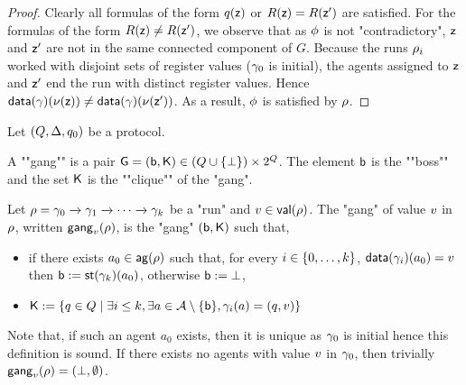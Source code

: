 \begin{proof}
	
	Clearly all formulas of the form $q(\mathsf{z})$ or $R(\mathsf{z}) = R(\mathsf{z}')$ are satisfied.
	For the formulas of the form $R(\mathsf{z}) \neq R(\mathsf{z}')$, we observe that as $\phi$ is not "contradictory", $\mathsf{z}$ and $\mathsf{z}'$ are not in the same connected component of $G$. Because the runs $\rho_i$ worked with disjoint sets of register values ($\gamma_0$ is initial), the agents assigned to $\mathsf{z}$ and $\mathsf{z}'$ end the run with distinct register values.
	Hence $\mathsf{data}(\gamma)(\nu(\mathsf{z})) \neq \mathsf{data}(\gamma)(\nu(\mathsf{z}'))$. As a result, $\phi$ is satisfied by $\rho$.
\end{proof}



\begin{definition}
	Let $(Q,\Delta, q_0)$ be a protocol.

	A ""gang"" is a pair $\mathsf{G} = (\mathsf{b}, \mathsf{K}) \in (Q \cup \{\bot\}) \times 2^{Q}$. The element $\mathsf{b}$ is the ""boss"" and the set $\mathsf{K}$ is the ""clique"" of the "gang". %

	Let $\rho = \gamma_0 \xrightarrow{} \gamma_1 \xrightarrow{} \cdots \xrightarrow{} \gamma_k$ be a "run" and $v \in \mathsf{val}(\rho)$. The "gang" of value $v$ in $\rho$, written $\mathsf{gang}_{v}(\rho)$, is the "gang" $(\mathsf{b}, \mathsf{K})$ such that, 
	\begin{itemize}
	\item if there exists $a_0 \in \mathsf{ag}(\rho)$ such that, 
	for every 
	$i \in \{0,\dots,k\}$, 
	$\mathsf{data}(\gamma_i)(a_0) = v$ then $\mathsf{b} := \mathsf{st}(\gamma_k)(a_0)$, otherwise $\mathsf{b} := \bot$, 
	\item  $\mathsf{K} := \{q \in Q \mid \exists i \leq k, \exists a \in \mathcal{A}\setminus \{\mathsf{b}\}, \gamma_i(a) = (q,v)\}$ %
	\end{itemize}
Note that, if such an agent $a_0$ exists, then it is unique as $\gamma_0$ is initial hence this definition is sound. If there exists no agents with value $v$ in $\gamma_0$, then trivially $\mathsf{gang}_{v}(\rho) = (\bot, \emptyset)$. 
\end{definition} 

